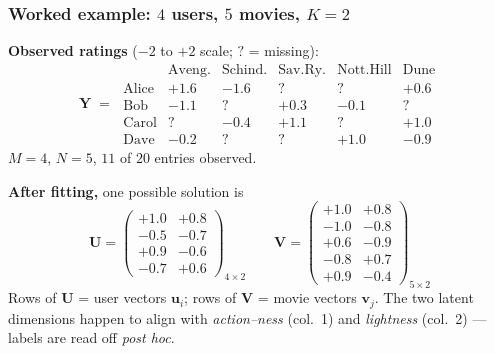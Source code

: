 \documentclass[notes,11pt, aspectratio=169]{beamer}
\newcommand{\vu}{\mathbf{u}}
\newcommand{\vv}{\mathbf{v}}
\newcommand{\vU}{\mathbf{U}}
\newcommand{\vV}{\mathbf{V}}
\newcommand{\vY}{\mathbf{Y}}
\begin{document}
\begin{frame}
\frametitle{Worked example: $4$ users, $5$ movies, $K=2$}

\textbf{Observed ratings} ($-2$ to $+2$ scale; $?$ = missing):
{\small
\[
\vY \;=\;
\begin{array}{r|ccccc}
        & \text{Aveng.} & \text{Schind.} & \text{Sav.Ry.} & \text{Nott.Hill} & \text{Dune} \\\hline
\text{Alice} & +1.6 & -1.6 & ? & ? & +0.6 \\
\text{Bob}   & -1.1 & ?    & +0.3 & -0.1 & ? \\
\text{Carol} & ?    & -0.4 & +1.1 & ?    & +1.0 \\
\text{Dave}  & -0.2 & ?    & ?    & +1.0 & -0.9
\end{array}
\]
}
$M\!=\!4$, $N\!=\!5$, $11$ of $20$ entries observed.

\vspace{6pt}
\textbf{After fitting,} one possible solution is
{\small
\[
\vU = \begin{pmatrix}
+1.0 & +0.8 \\
-0.5 & -0.7 \\
+0.9 & -0.6 \\
-0.7 & +0.6
\end{pmatrix}_{\!\!4\times 2}
\qquad
\vV = \begin{pmatrix}
+1.0 & +0.8 \\
-1.0 & -0.8 \\
+0.6 & -0.9 \\
-0.8 & +0.7 \\
+0.9 & -0.4
\end{pmatrix}_{\!\!5\times 2}
\]
}
Rows of $\vU$ = user vectors $\vu_i$; rows of $\vV$ = movie vectors $\vv_j$. The two latent dimensions happen to align with \emph{action--ness} (col.\ 1) and \emph{lightness} (col.\ 2) --- labels are read off \emph{post hoc}.
\end{frame}
\end{document}
